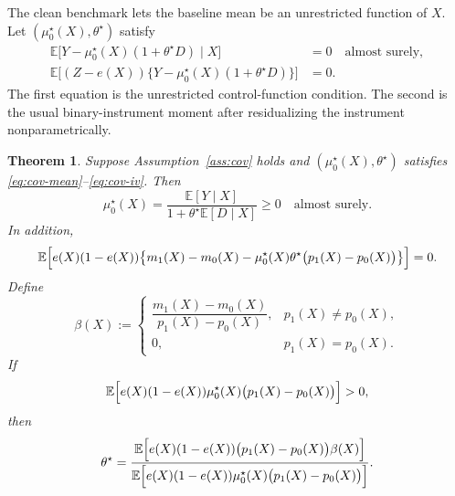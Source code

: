 \documentclass[11pt]{article}
\numberwithin{equation}{section}
\newcommand{\E}{\mathbb E}
\newcommand{\1}{\mathbf 1}
\newtheorem{theorem}[assumption]{Theorem}
\theoremstyle{remark}
\begin{document}
The clean benchmark lets the baseline mean be an unrestricted function of $X$.
Let $(\mu_0^\star(X),\theta^\star)$ satisfy
\begin{align}
\E\bigl[Y-\mu_0^\star(X)(1+\theta^\star D)\mid X\bigr] &= 0
\quad \text{almost surely}, \label{eq:cov-mean}\\
\E\bigl[(Z-e(X))\{Y-\mu_0^\star(X)(1+\theta^\star D)\}\bigr] &= 0.
\label{eq:cov-iv}
\end{align}
The first equation is the unrestricted control-function condition. The second is the
usual binary-instrument moment after residualizing the instrument nonparametrically.

\begin{theorem}\label{thm:cov-saturated}
Suppose Assumption~\ref{ass:cov} holds and $(\mu_0^\star(X),\theta^\star)$ satisfies
\eqref{eq:cov-mean}--\eqref{eq:cov-iv}. Then
\[
\mu_0^\star(X)
= \frac{\E[Y\mid X]}{1+\theta^\star\E[D\mid X]} \ge 0
\quad \text{almost surely}.
\]
In addition,
\begin{equation}\label{eq:cov-basic}
\E\Bigl[e(X)(1-e(X))\bigl\{m_1(X)-m_0(X)-\mu_0^\star(X)\theta^\star
\bigl(p_1(X)-p_0(X)\bigr)\bigr\}\Bigr] = 0.
\end{equation}
Define
\[
\beta(X) :=
\begin{cases}
\dfrac{m_1(X)-m_0(X)}{p_1(X)-p_0(X)}, & p_1(X)\neq p_0(X),\\[1.25ex]
0, & p_1(X)=p_0(X).
\end{cases}
\]
If
\begin{equation}\label{eq:cov-positive}
\E\Bigl[e(X)(1-e(X))\mu_0^\star(X)\bigl(p_1(X)-p_0(X)\bigr)\Bigr] > 0,
\end{equation}
then
\begin{equation}\label{eq:cov-ratio}
\theta^\star
= \frac{\E\Bigl[e(X)(1-e(X))\bigl(p_1(X)-p_0(X)\bigr)\beta(X)\Bigr]}
{\E\Bigl[e(X)(1-e(X))\mu_0^\star(X)\bigl(p_1(X)-p_0(X)\bigr)\Bigr]}.
\end{equation}
\end{theorem}
\end{document}
